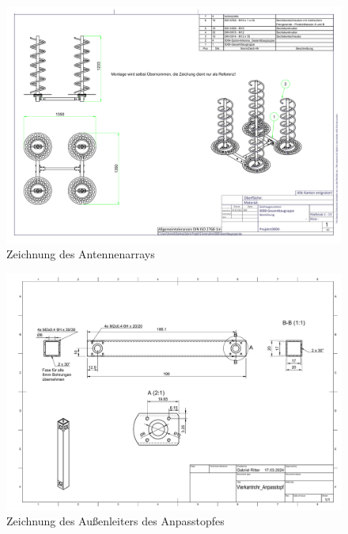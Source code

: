 \begin{figure}[h!]
	\includegraphics[angle=90,width=\textwidth]{../ref/0000-Gesamtbaugruppe.pdf}
	\caption{Zeichnung des Antennenarrays}
	\label{fig:Zeichnung-Antennenarray}
\end{figure}

\begin{figure}[h!]
	\includegraphics[angle=90,width=\textwidth]{../ref/Anpasstopf-Vierkantrohr.pdf}
	\caption{Zeichnung des Außenleiters des Anpasstopfes}
	\label{fig:Zeichnung-anpasstopf-vierkantrohr}
\end{figure}

